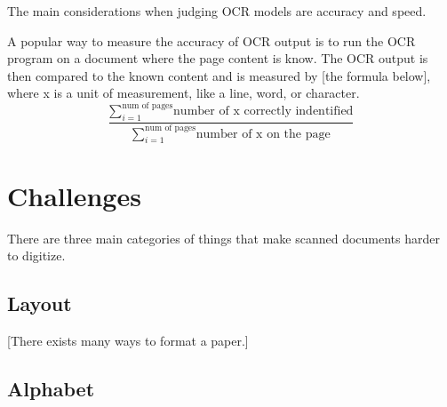 \documentclass[sigplan,screen,nonacm]{acmart-tagged}
\begin{document}
The main considerations when judging OCR models are accuracy and speed.\cite{Raj:2022} 


A popular way to measure the accuracy of OCR output is to run the OCR program on a document where the page content is know. The OCR output is then compared to the known content and is measured by [the formula below], where x is a unit of measurement, like a line, word, or character.
\[
\dfrac{\sum\limits_{i=1}^\text{num of pages}\text{number of x correctly indentified}}{\sum\limits_{i=1}^\text{num of pages}\text{number of x on the page}}
\]


\section{Challenges}
\label{sec:body}

There are three main categories of things that make scanned documents harder to digitize. 

\subsection{Layout}
\label{sec:Layout}

[There exists many ways to format a paper.] 



\subsection{Alphabet}
\label{sec:Alphabet}

\end{document}
